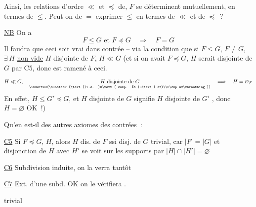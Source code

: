 
Ainsi, les relations d'ordre $\ll$ et $\preceq$ de, $F$ se déterminent mutuellement, en termes de $\leq$. Peut-on de $=$ exprimer $\leq$ en termes de $\ll$ et de $\preceq$~?

\uline{NB} On a
\[
 F\leq G\text{ et }F\preceq G\quad\Longrightarrow\quad F=G
\]
Il faudra que ceci soit vrai dans  contrée -- via la condition que si $F\leq G$, $F\ne G$, $\exists\,H$  \uline{non vide} $H$ disjointe de $F$, $H\ll G$ (et si on avait $F\preceq G$, $H$ serait disjointe de $G$ par C5, donc  est ramené à ceci. 
\[
 H\ll G,\quad
 \underset{\inserted{\substack{\text{(i.e. }H\text{ comp. à }G\text{ et}\\H\cap G=\varnothing}}}{H\text{ disjointe de }G}
 \quad\Longrightarrow\quad H=\varnothing_{F}
\]
En effet, $H\leq G'\preceq G$,  et $H$ disjointe de $G$ signifie $H$ disjointe de $G'$ , donc $H=\varnothing$ OK~!)


Qu'en est-il des autres axiomes des contrées~:

\uline{C5} Si $F\preceq G$, $H$, alors $H$ dis. de $F$ ssi disj. de $G$ trivial, car $|F|=|G|$ et disjonction de $H$ avec $H'$ se voit sur les supports par $|H|\cap|H'|=\varnothing$

\uline{C6} Subdivision induite, on la verra tantôt

\uline{C7} Ext. d'une subd. OK on le vérifiera .

\uline{} trivial
